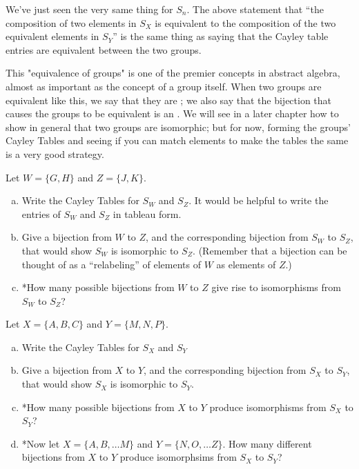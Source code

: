 We've just seen the very same thing for $S_n$. The above statement that ``the composition of two elements in $S_X$ is equivalent to the composition of the two equivalent elements in $S_Y$''  is the same thing as saying that  the Cayley table entries are equivalent between the two groups.

This "equivalence of groups" is one of the premier concepts in abstract algebra, almost as important as the concept of a group  itself.  When two groups are equivalent like this, we say that they are ; we also say that the bijection that causes the groups to be equivalent is an .  We will see in a later chapter how to show in general that two groups are isomorphic; but for now, forming the groups' Cayley Tables and seeing if you can match elements to make the tables the same is a very good strategy.

\begin{exercise}{}
Let $W =\{G, H \}$ and $Z = \{J, K \}$.
\begin{enumerate}[(a)]
\item
Write the Cayley Tables for $S_W$ and $S_Z$. It would be helpful to write the entries of $S_W$ and $S_Z$ in tableau form. 
\item
Give a bijection from $W$ to $Z$, and the corresponding bijection from $S_W$ to $S_Z$, that would show $S_W$ is isomorphic to $S_Z$. (Remember that a bijection can be thought of as  a ``relabeling'' of elements of $W$ as elements of $Z$.)
\item
*How many possible bijections from $W$ to $Z$ give rise to isomorphisms from  $S_W$ to  $S_Z$?
\end{enumerate}
\end{exercise}


\begin{exercise}{11}
Let $X =\{A, B, C\}$ and $Y = \{M, N, P\}$.
\begin{enumerate}[(a)]
\item
Write the Cayley Tables for $S_X$ and $S_Y$
\item
Give a bijection from $X$ to $Y$, and the corresponding bijection from $S_X$ to $S_Y$, that would show $S_X$ is isomorphic to $S_Y$.
\item
*How many possible bijections from $X$ to $Y$ produce isomorphisms from $S_X$ to $S_Y$?
\item
*Now let $X =\{A, B, \ldots M\}$ and $Y = \{N, O, \ldots Z\}$. How many different bijections from $X$ to $Y$ produce isomorphsims from $S_X$ to $S_Y$?

\end{enumerate}
\end{exercise}

